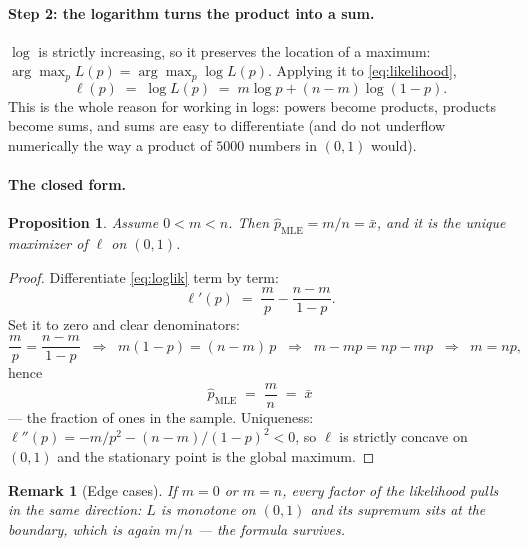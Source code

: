 \documentclass[11pt]{article}
\newtheorem{proposition}{Proposition}
\newtheorem{remark}{Remark}
\newcommand{\xbar}{\bar{x}}
\newcommand{\phat}{\hat{p}}
\begin{document}
\paragraph{Step 2: the logarithm turns the product into a sum.}
$\log$ is strictly increasing, so it preserves the location of a maximum:
$\arg\max_p L(p) = \arg\max_p \log L(p)$. Applying it to
\eqref{eq:likelihood},
\begin{equation}
  \ell(p) \;=\; \log L(p) \;=\; m\log p + (n-m)\log(1-p).
  \label{eq:loglik}
\end{equation}
This is the whole reason for working in logs: powers become products,
products become sums, and sums are easy to differentiate (and do not
underflow numerically the way a product of $5000$ numbers in $(0,1)$
would).

\paragraph{The closed form.}

\begin{proposition}
Assume $0 < m < n$. Then $\phat_{\mathrm{MLE}} = m/n = \xbar$, and it is
the unique maximizer of $\ell$ on $(0,1)$.
\end{proposition}

\begin{proof}
Differentiate \eqref{eq:loglik} term by term:
\begin{equation*}
  \ell'(p) \;=\; \frac{m}{p} - \frac{n-m}{1-p}.
\end{equation*}
Set it to zero and clear denominators:
\begin{equation*}
  \frac{m}{p} = \frac{n-m}{1-p}
  \;\;\Longrightarrow\;\;
  m(1-p) = (n-m)\,p
  \;\;\Longrightarrow\;\;
  m - mp = np - mp
  \;\;\Longrightarrow\;\;
  m = np,
\end{equation*}
hence
\begin{equation}
  \boxed{\;\phat_{\mathrm{MLE}} \;=\; \frac{m}{n} \;=\; \xbar\;}
  \label{eq:phat}
\end{equation}
--- the fraction of ones in the sample. Uniqueness:
$\ell''(p) = -m/p^{2} - (n-m)/(1-p)^{2} < 0$, so $\ell$ is strictly concave
on $(0,1)$ and the stationary point is the global maximum.
\end{proof}

\begin{remark}[Edge cases]
If $m = 0$ or $m = n$, every factor of the likelihood pulls in the same
direction: $L$ is monotone on $(0,1)$ and its supremum sits at the
boundary, which is again $m/n$ --- the formula survives.
\end{remark}
\end{document}
